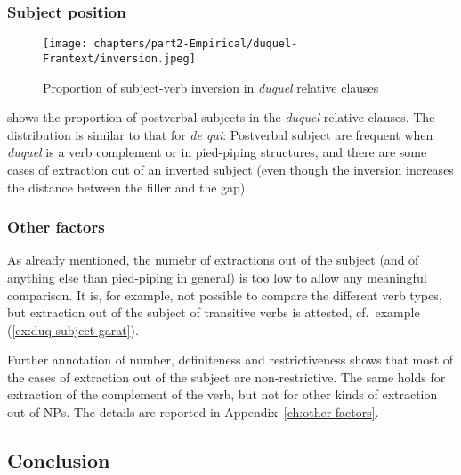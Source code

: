 
\subsubsection{Subject position}

    \begin{figure}
    \centering
    \texttt{[image: chapters/part2-Empirical/duquel-Frantext/inversion.jpeg]}
    \caption{Proportion of subject-verb inversion in \emph{duquel} relative clauses}
    \label{fig:duq-inv}
    \end{figure}
shows the proportion of postverbal subjects in the \emph{duquel} relative clauses. The distribution is similar to that for \emph{de qui}: Postverbal subject are frequent when \emph{duquel} is a verb complement or in pied-piping structures, and there are some cases of extraction out of an inverted subject (even though the inversion increases the distance between the filler and the gap). 

\subsubsection{Other factors}

As already mentioned, the numebr of extractions out of the subject (and of anything else than pied-piping in general) is too low to allow any meaningful comparison. It is, for example, not possible to compare the different verb types, but extraction out of the subject of transitive verbs is attested, cf.\ example (\ref{ex:duq-subject-garat}). 

Further annotation of number, definiteness and restrictiveness shows that most of the cases of extraction out of the subject are non-restrictive. The same holds for extraction of the complement of the verb, but not for other kinds of extraction out of NPs. The details are reported in Appendix~\ref{ch:other-factors}.

\subsection{Conclusion}

